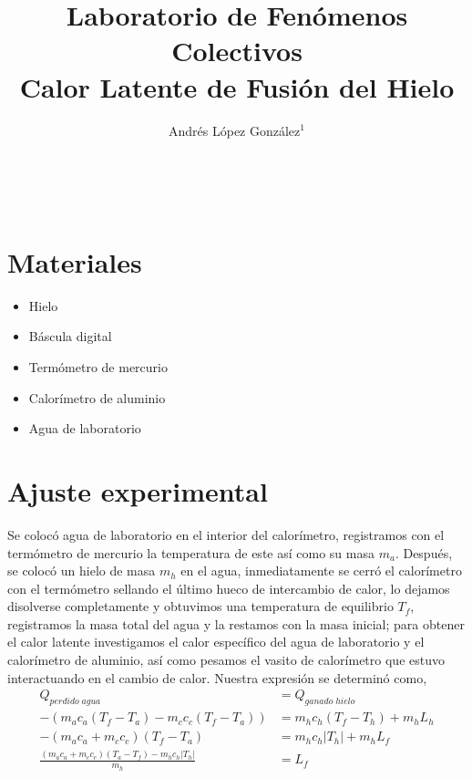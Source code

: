 \documentclass[article,12pt]{elsarticle}
\begin{document}
\begin{frontmatter}
    \title{Laboratorio de Fenómenos Colectivos \\ Calor Latente de Fusión del Hielo} \\
    \author{Andrés López González$^1$} %
    \address{$^1$ Facultad de Ciencias, Universidad Nacional Autónoma de México, M\'exico CDMX.}
\end{frontmatter}

\section{Materiales}
\begin{itemize}
\item Hielo
\item Báscula digital
\item Termómetro de mercurio
\item Calorímetro de aluminio
\item Agua de laboratorio
\end{itemize}

\section{Ajuste experimental}

Se colocó agua de laboratorio en el interior del calorímetro, registramos con el termómetro de mercurio la temperatura de este así como su masa $m_a$. Después, se colocó un hielo de masa $m_h$ en el agua, inmediatamente se cerró el calorímetro con el termómetro sellando el último hueco de intercambio de calor, lo dejamos disolverse completamente y obtuvimos una temperatura de equilibrio $T_f$, registramos la masa total del agua y la restamos con la masa inicial; para obtener el calor latente investigamos el calor específico del agua de laboratorio y el calorímetro de aluminio, así como pesamos el vasito de calorímetro que estuvo interactuando en el cambio de calor. Nuestra expresión se determinó como,
\begin{align*}
    Q_{perdido\;agua} &= Q_{ganado\;hielo} \\
    -(m_ac_a(T_f-T_a)-m_cc_c(T_f-T_a)) &= m_hc_h(T_f-T_h)+m_hL_h \\
    -(m_ac_a+m_cc_c)(T_f-T_a) &= m_hc_h|T_h| + m_hL_f \\
    \frac{(m_ac_a+m_cc_c)(T_a-T_f)-m_hc_h|T_h|}{m_h} &= L_f
\end{align*}
\end{document}
